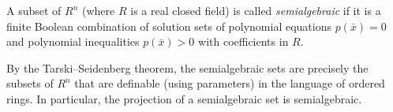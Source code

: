 A subset of $R^n$ (where $R$ is a real closed field) is called \emph{semialgebraic} if it is a finite Boolean combination of solution sets of polynomial equations $p(\bar{x}) = 0$ and polynomial inequalities $p(\bar{x}) > 0$ with coefficients in $R$.

By the Tarski–Seidenberg theorem, the semialgebraic sets are precisely the subsets of $R^n$ that are definable (using parameters) in the language of ordered rings. In particular, the projection of a semialgebraic set is semialgebraic.
